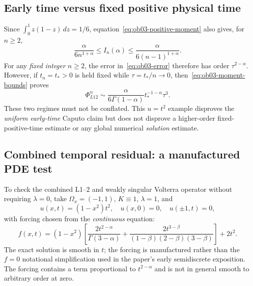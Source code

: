 \documentclass[11pt,a4paper]{amsart}
\theoremstyle{remark}
\theoremstyle{plain}
\theoremstyle{remark}
\numberwithin{equation}{section}
\begin{document}
\subsection{Early time versus fixed positive physical time}
Since $\int_0^1z(1-z)\,dz=1/6$, equation~\eqref{eq:ob03-positive-moment} also gives, for $n\ge2$,
\begin{equation}\label{eq:ob03-moment-bounds}
 \frac{\alpha}{6n^{1+\alpha}}\le I_n(\alpha)\le
 \frac{\alpha}{6(n-1)^{1+\alpha}}.
\end{equation}
For any \emph{fixed integer} $n\ge2$, the error in~\eqref{eq:ob03-error} therefore has order $\tau^{2-\alpha}$. However, if $t_n=t_*>0$ is held fixed while $\tau=t_*/n\to0$, then~\eqref{eq:ob03-moment-bounds} proves
\begin{equation}\label{eq:ob03-fixed-time}
 \Phi_{L12}^{n}\sim\frac{\alpha}{6\Gamma(1-\alpha)}
 t_*^{-1-\alpha}\tau^3.
\end{equation}
These two regimes must not be conflated. This $u=t^2$ example disproves the \emph{uniform early-time} Caputo claim but does not disprove a higher-order fixed-positive-time estimate or any global numerical \emph{solution} estimate.

\subsection{Combined temporal residual: a manufactured PDE test}
To check the combined L1--2 and weakly singular Volterra operator without requiring $\lambda=0$, take $\Omega_x=(-1,1)$, $K\equiv1$, $\lambda=1$, and
\begin{equation}\label{eq:ob03-manufactured}
 u(x,t)=(1-x^2)t^2,
\quad u(x,0)=0,\quad u(\pm1,t)=0,
\end{equation}
with forcing chosen from the \emph{continuous} equation:
\begin{equation}\label{eq:ob03-forcing}
 f(x,t)=(1-x^2)\left[\frac{2t^{2-\alpha}}{\Gamma(3-\alpha)}
 +\frac{2t^{3-\beta}}{(1-\beta)(2-\beta)(3-\beta)}\right]+2t^2.
\end{equation}
The exact solution is smooth in $t$; the forcing is manufactured rather than the $f=0$ notational simplification used in the paper's early semidiscrete exposition. The forcing contains a term proportional to $t^{2-\alpha}$ and is not in general smooth to arbitrary order at zero.
\end{document}
